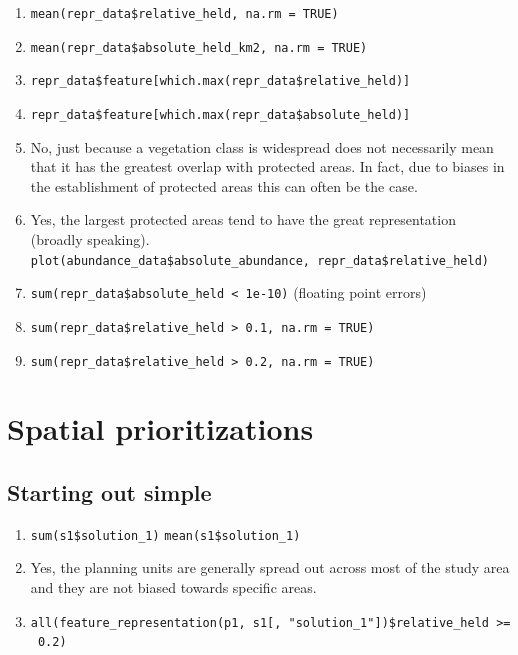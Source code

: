 \documentclass[12pt,]{book}
\makeatletter
\providecommand{\tightlist}{%
  \setlength{\itemsep}{0pt}\setlength{\parskip}{0pt}}
\newenvironment{kframe}{%
\medskip{}
\setlength{\fboxsep}{.8em}
 \def\at@end@of@kframe{}%
 \ifinner\ifhmode%
  \def\at@end@of@kframe{\end{minipage}}%
  \begin{minipage}{\columnwidth}%
 \fi\fi%
 \def\FrameCommand##1{\hskip\@totalleftmargin \hskip-\fboxsep
 \colorbox{shadecolor}{##1}\hskip-\fboxsep
     \hskip-\linewidth \hskip-\@totalleftmargin \hskip\columnwidth}%
 \MakeFramed {\advance\hsize-\width
   \@totalleftmargin\z@ \linewidth\hsize
   \@setminipage}}%
 {\par\unskip\endMakeFramed%
 \at@end@of@kframe}
\newenvironment{rmdblock}[1]
  {
  \begin{itemize}
  \renewcommand{\labelitemi}{
    \raisebox{-.7\height}[0pt][0pt]{
      {\setkeys{Gin}{width=3em,keepaspectratio}\texttt{[image: images/\#1]}}
    }
  }
  \setlength{\fboxsep}{1em}
  \begin{kframe}
  \item
  }
  {
  \end{kframe}
  \end{itemize}
  }
\newenvironment{rmdanswer}
  {\begin{rmdblock}{answer}}
  {\end{rmdblock}}
\makeatother
\begin{document}
\begin{rmdanswer}
\begin{enumerate}
\def\labelenumi{\arabic{enumi}.}
\tightlist
\item
  \texttt{mean(repr\_data\$relative\_held,\ na.rm\ =\ TRUE)}
\item
  \texttt{mean(repr\_data\$absolute\_held\_km2,\ na.rm\ =\ TRUE)}
\item
  \texttt{repr\_data\$feature{[}which.max(repr\_data\$relative\_held){]}}
\item
  \texttt{repr\_data\$feature{[}which.max(repr\_data\$absolute\_held){]}}
\item
  No, just because a vegetation class is widespread does not necessarily mean that it has the greatest overlap with protected areas. In fact, due to biases in the establishment of protected areas this can often be the case.
\item
  Yes, the largest protected areas tend to have the great representation (broadly speaking). \newline
  \texttt{plot(abundance\_data\$absolute\_abundance,\ repr\_data\$relative\_held)}
\item
  \texttt{sum(repr\_data\$absolute\_held\ \textless{}\ 1e-10)} (floating point errors)
\item
  \texttt{sum(repr\_data\$relative\_held\ \textgreater{}\ 0.1,\ na.rm\ =\ TRUE)}
\item
  \texttt{sum(repr\_data\$relative\_held\ \textgreater{}\ 0.2,\ na.rm\ =\ TRUE)}
\end{enumerate}
\end{rmdanswer}

\hypertarget{spatial-prioritizations-1}{%
\section{Spatial prioritizations}\label{spatial-prioritizations-1}}

\hypertarget{starting-out-simple-1}{%
\subsection{Starting out simple}\label{starting-out-simple-1}}

\begin{rmdanswer}
\begin{enumerate}
\def\labelenumi{\arabic{enumi}.}
\tightlist
\item
  \texttt{sum(s1\$solution\_1)} \newline
  \texttt{mean(s1\$solution\_1)}
\item
  Yes, the planning units are generally spread out across most of the study area and they are not biased towards specific areas.
\item
  \texttt{all(feature\_representation(p1,\ s1{[},\ "solution\_1"{]})\$relative\_held\ \textgreater{}=\ 0.2)}
\end{enumerate}
\end{rmdanswer}
\end{document}
